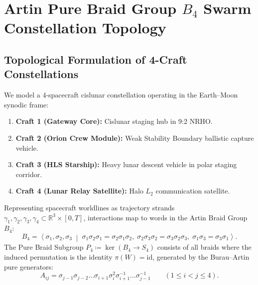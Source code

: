 \documentclass[11pt,a4paper,reqno]{article}
\theoremstyle{plain}
\theoremstyle{definition}
\theoremstyle{remark}
\numberwithin{equation}{section}
\numberwithin{table}{section}
\begin{document}
\section{Artin Pure Braid Group \texorpdfstring{$B_4$}{B4} Swarm Constellation Topology}
\label{sec:artin_braid_swarm}

\subsection{Topological Formulation of 4-Craft Constellations}
We model a 4-spacecraft cislunar constellation operating in the Earth--Moon synodic frame:
\begin{enumerate}
  \item \textbf{Craft 1 (Gateway Core):} Cislunar staging hub in 9:2 NRHO.
  \item \textbf{Craft 2 (Orion Crew Module):} Weak Stability Boundary ballistic capture vehicle.
  \item \textbf{Craft 3 (HLS Starship):} Heavy lunar descent vehicle in polar staging corridor.
  \item \textbf{Craft 4 (Lunar Relay Satellite):} Halo $L_2$ communication satellite.
\end{enumerate}

Representing spacecraft worldlines as trajectory strands $\gamma_1, \gamma_2, \gamma_3, \gamma_4 \subset \mathbb{R}^3 \times [0, T]$, interactions map to words in the Artin Braid Group $B_4$:
\begin{equation}
  B_4 = \left\langle \sigma_1, \sigma_2, \sigma_3 \;\middle|\; \sigma_1 \sigma_2 \sigma_1 = \sigma_2 \sigma_1 \sigma_2, \; \sigma_2 \sigma_3 \sigma_2 = \sigma_3 \sigma_2 \sigma_3, \; \sigma_1 \sigma_3 = \sigma_3 \sigma_1 \right\rangle.
  \label{eq:braid_group_presentation}
\end{equation}
The Pure Braid Subgroup $P_4 \coloneqq \ker(B_4 \to S_4)$ consists of all braids where the induced permutation is the identity $\pi(W) = \mathrm{id}$, generated by the Burau--Artin pure generators:
\begin{equation}
  A_{ij} = \sigma_{j-1} \sigma_{j-2} \dots \sigma_{i+1} \sigma_i^2 \sigma_{i+1}^{-1} \dots \sigma_{j-1}^{-1} \qquad (1 \le i < j \le 4).
  \label{eq:pure_braid_generators}
\end{equation}
\end{document}
